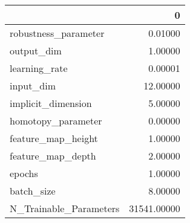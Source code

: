 \begin{tabular}{lr}
\toprule
{} &            0 \\
\midrule
robustness\_parameter   &      0.01000 \\
output\_dim             &      1.00000 \\
learning\_rate          &      0.00001 \\
input\_dim              &     12.00000 \\
implicit\_dimension     &      5.00000 \\
homotopy\_parameter     &      0.00000 \\
feature\_map\_height     &      1.00000 \\
feature\_map\_depth      &      2.00000 \\
epochs                 &      1.00000 \\
batch\_size             &      8.00000 \\
N\_Trainable\_Parameters &  31541.00000 \\
\bottomrule
\end{tabular}
